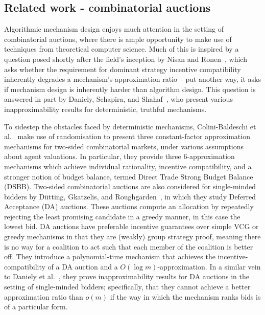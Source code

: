 \documentclass[10pt,a4paper]{article}
\theoremstyle{plain}
\theoremstyle{definition}
\begin{document}
	\subsection{Related work - combinatorial auctions}

	Algorithmic mechanism design enjoys much attention in the setting of
	combinatorial auctions, where there is ample opportunity to make use of
	techniques from theoretical computer science. Much of this is inspired by a
	question posed shortly after the field's inception by Nisan and
	Ronen~\cite{Nisan2001}, which asks whether the requirement for dominant
	strategy incentive compatibility inherently degrades a mechanism's
	approximation ratio -- put another way, it asks if mechanism design is
	inherently harder than algorithm design. This question is answered in part
	by Daniely, Schapira, and Shahaf~\cite{Daniely2018}, who present various
	inapproximability results for deterministic, truthful mechanisms.

	To sidestep the obstacles faced by deterministic mechanisms,
	Colini-Baldeschi et al.~\cite{ColiniBaldeschi2017} make use of
	randomisation to present three constant-factor approximation mechanisms for
	two-sided combinatorial markets, under various assumptions about agent
	valuations. In particular, they provide three 6-approximation mechanisms
	which achieve individual rationality, incentive compatibility, and a
	stronger notion of budget balance, termed Direct Trade Strong Budget
	Balance (DSBB). Two-sided combinatorial auctions are also considered for
	single-minded bidders by D\"utting, Gkatzelis, and
	Roughgarden~\cite{Dutting2017}, in which they study Deferred Acceptance
	(DA) auctions. These auctions compute an allocation by repeatedly rejecting
	the least promising candidate in a greedy manner, in this case the lowest
	bid. DA auctions have preferable incentive guarantees over simple VCG or
	greedy mechanisms in that they are (weakly) group strategy proof, meaning
	there is no way for a coalition to act such that each member of the
	coalition is better off. They introduce a polynomial-time mechanism that
	achieves the incentive-compatibility of a DA auction and a $O(\log
	m)$-approximation. In a similar vein to Daniely et al.~\cite{Daniely2018},
	they prove inapproximability results for DA auctions in the setting of
	single-minded bidders; specifically, that they cannot achieve a better
	approximation ratio than $o(m)$ if the way in which the mechanism ranks
	bids is of a particular form.
\end{document}
